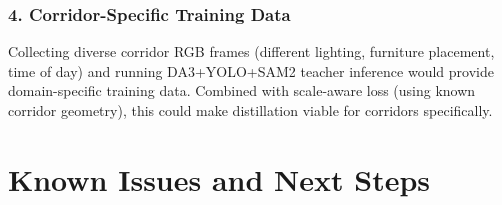 \documentclass[11pt,a4paper]{article}
\begin{document}
\subsubsection{4. Corridor-Specific Training Data}

Collecting diverse corridor RGB frames (different lighting, furniture
placement, time of day) and running DA3+YOLO+SAM2 teacher inference
would provide domain-specific training data. Combined with scale-aware
loss (using known corridor geometry), this could make distillation
viable for corridors specifically.

\section{Known Issues and Next Steps}
\label{sec:next}
\end{document}
